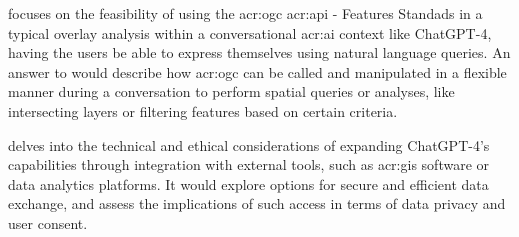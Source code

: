  focuses on the feasibility of using the \acrshort{acr:ogc} \acrshort{acr:api} - Features Standads in a typical overlay analysis within a conversational \acrshort{acr:ai} context like ChatGPT-4, having the users be able to express themselves using natural language queries. An answer to  would describe how \acrshort{acr:ogc}  can be called and manipulated in a flexible manner during a conversation to perform spatial queries or analyses, like intersecting layers or filtering features based on certain criteria.

 delves into the technical and ethical considerations of expanding ChatGPT-4's capabilities through integration with external tools, such as \acrshort{acr:gis} software or data analytics platforms. It would explore options for secure and efficient data exchange, and assess the implications of such access in terms of data privacy and user consent.

